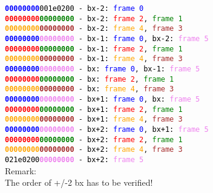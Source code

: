 \texttt{\textcolor{blue}{\textbf{00000000}}\textcolor{black}{001e0200} - \textcolor{black}{bx-2:} \textcolor{blue}{frame 0}}\\
\texttt{\textcolor{red}{\textbf{00000000}}\textcolor{green}{\textbf{00000000}} - \textcolor{black}{bx-2:} \textcolor{red}{frame 2}, \textcolor{green}{frame 1}}\\
\texttt{\textcolor{orange}{\textbf{00000000}}\textcolor{brown}{\textbf{00000000}} - \textcolor{black}{bx-2:} \textcolor{orange}{frame 4}, \textcolor{brown}{frame 3}}\\
\texttt{\textcolor{blue}{\textbf{00000000}}\textcolor{violet}{\textbf{00000000}} - \textcolor{black}{bx-1:} \textcolor{blue}{frame 0}, \textcolor{black}{bx-2:} \textcolor{violet}{frame 5}}\\
\texttt{\textcolor{red}{\textbf{00000000}}\textcolor{green}{\textbf{00000000}} - \textcolor{black}{bx-1:} \textcolor{red}{frame 2}, \textcolor{green}{frame 1}}\\
\texttt{\textcolor{orange}{\textbf{00000000}}\textcolor{brown}{\textbf{00000000}} - \textcolor{black}{bx-1:} \textcolor{orange}{frame 4}, \textcolor{brown}{frame 3}}\\
\texttt{\textcolor{blue}{\textbf{00000000}}\textcolor{violet}{\textbf{00000000}} - \textcolor{black}{bx:} \textcolor{blue}{frame 0}, \textcolor{black}{bx-1:} \textcolor{violet}{frame 5}}\\
\texttt{\textcolor{red}{\textbf{00000000}}\textcolor{green}{\textbf{00000000}} - \textcolor{black}{bx:} \textcolor{red}{frame 2}, \textcolor{green}{frame 1}}\\
\texttt{\textcolor{orange}{\textbf{00000000}}\textcolor{brown}{\textbf{00000000}} - \textcolor{black}{bx:} \textcolor{orange}{frame 4}, \textcolor{brown}{frame 3}}\\
\texttt{\textcolor{blue}{\textbf{00000000}}\textcolor{violet}{\textbf{00000000}} - \textcolor{black}{bx+1:} \textcolor{blue}{frame 0}, \textcolor{black}{bx:} \textcolor{violet}{frame 5}}\\
\texttt{\textcolor{red}{\textbf{00000000}}\textcolor{green}{\textbf{00000000}} - \textcolor{black}{bx+1:} \textcolor{red}{frame 2}, \textcolor{green}{frame 1}}\\
\texttt{\textcolor{orange}{\textbf{00000000}}\textcolor{brown}{\textbf{00000000}} - \textcolor{black}{bx+1:} \textcolor{orange}{frame 4}, \textcolor{brown}{frame 3}}\\
\texttt{\textcolor{blue}{\textbf{00000000}}\textcolor{violet}{\textbf{00000000}} - \textcolor{black}{bx+2:} \textcolor{blue}{frame 0}, \textcolor{black}{bx+1:} \textcolor{violet}{frame 5}}\\
\texttt{\textcolor{red}{\textbf{00000000}}\textcolor{green}{\textbf{00000000}} - \textcolor{black}{bx+2:} \textcolor{red}{frame 2}, \textcolor{green}{frame 1}}\\
\texttt{\textcolor{orange}{\textbf{00000000}}\textcolor{brown}{\textbf{00000000}} - \textcolor{black}{bx+2:} \textcolor{orange}{frame 4}, \textcolor{brown}{frame 3}}\\
\texttt{\textcolor{black}{021e0200}\textcolor{violet}{\textbf{00000000}} - \textcolor{black}{bx+2:} \textcolor{violet}{frame 5}}\\

Remark:\\
The order of +/-2 bx has to be verified!
